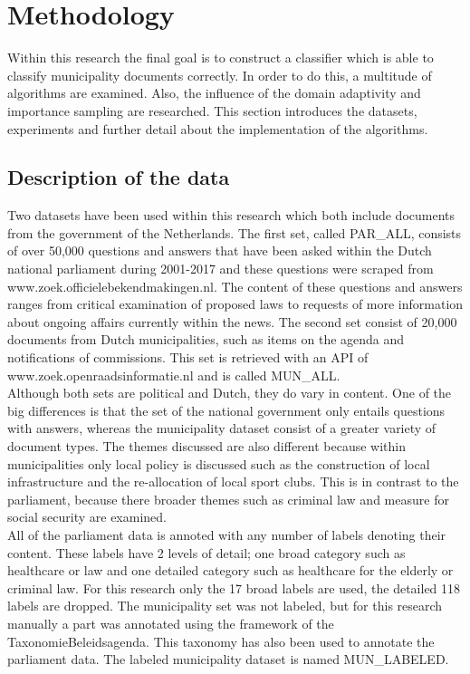 \section{Methodology}
\label{sec:meth}
Within this research the final goal is to construct a classifier which is able to classify municipality documents correctly. In order to do this, a multitude of algorithms are examined. Also, the influence of the domain adaptivity and importance sampling are researched. This section introduces the datasets, experiments and further detail about the implementation of the algorithms.

\subsection{Description of the data}
\label{subsec:data}
Two datasets have been used within this research which both include documents from the government of the Netherlands. The first set, called PAR\_ALL, consists of over 50,000 questions and answers that have been asked within the Dutch national parliament during 2001-2017 and these questions were scraped from www.zoek.officielebekendmakingen.nl. The content of these questions and answers ranges from critical examination of proposed laws to requests of more information about ongoing affairs currently within the news. The second set consist of 20,000 documents from Dutch municipalities, such as items on the agenda and notifications of commissions. This set is retrieved with an API of www.zoek.openraadsinformatie.nl and is called MUN\_ALL. \\
Although both sets are political and Dutch, they do vary in content. One of the big differences is that the set of the national government only entails questions with answers, whereas the municipality dataset consist of a greater variety of document types. The themes discussed are also different because within municipalities only local policy is discussed such as the construction of local infrastructure and the re-allocation of local sport clubs. This is in contrast to the parliament, because there broader themes such as criminal law and measure for social security are examined.\\
All of the parliament data is annoted with any number of labels denoting their content. These labels have 2 levels of detail; one broad category such as healthcare or law and one detailed category such as healthcare for the elderly or criminal law. For this research only the 17 broad labels are used, the detailed 118 labels are dropped. The municipality set was not labeled, but for this research manually a part was annotated using the framework of the TaxonomieBeleidsagenda. This taxonomy has also been used to annotate the parliament data. The labeled municipality dataset is named MUN\_LABELED.

